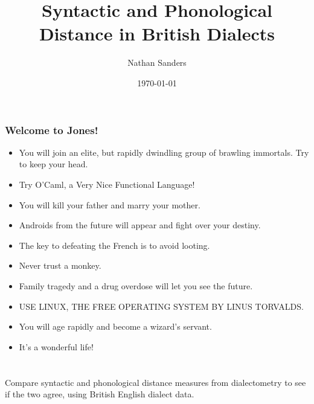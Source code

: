 \documentclass{beamer}
\title{Syntactic and Phonological Distance in British Dialects}
\author{Nathan Sanders}
\date{\today}
\begin{document}
\begin{frame}
  \frametitle{Welcome to Jones!}

  \begin{itemize}
  \item You will join an elite, but rapidly dwindling group of brawling immortals. Try to keep your head.
  \item Try O'Caml, a Very Nice Functional Language!
  \item You will kill your father and marry your mother.
  \item  Androids from the future will appear and fight over your destiny.
  \item  The key to defeating the French is to avoid looting.
  \item  Never trust a monkey.
  \item  Family tragedy and a drug overdose will let you see the future.
  \item  USE LINUX, THE FREE OPERATING SYSTEM BY LINUS TORVALDS.
  \item You will age rapidly and become a wizard's servant.
  \item It's a wonderful life!
  \end{itemize}
\end{frame}

\frame{\titlepage}

\section[Outline]{}
\frame{\tableofcontents}
\begin{frame}
  Compare syntactic and phonological distance measures from
  dialectometry to see if the two agree, using British English dialect data.
\end{frame}
\end{document}
